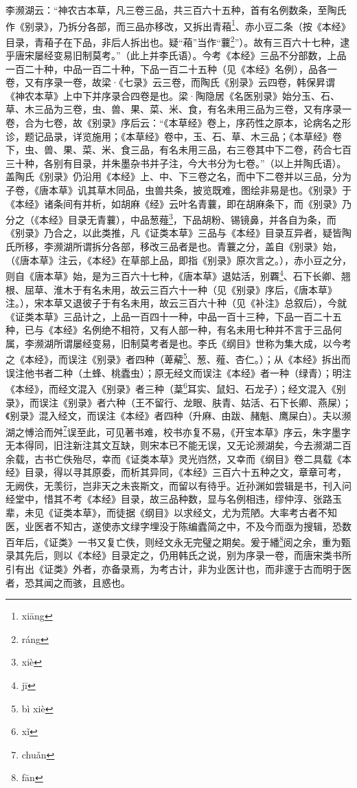 \documentclass[12pt,UTF8]{ctexbook}
\begin{document}
李濒湖云：“神农古本草，凡三卷三品，共三百六十五种，首有名例数条，至陶氏作《别录》，乃拆分各部，而三品亦移改，又拆出青葙\footnote{xi\=ang}、赤小豆二条（按《本经》目录，青葙子在下品，非后人拆出也。疑“葙”当作“蘘\footnote{r\'ang}”）。故有三百六十七种，逮乎唐宋屡经变易旧制莫考。”（此上并李氏语）。今考《本经》三品不分部数，上品一百二十种，中品一百二十种，下品一百二十五种（见《本经》名例），品各一卷，又有序录一卷，故梁·《七录》云三卷，而陶氏《别录》云四卷，韩保昇谓《神农本草》上中下并序录合四卷是也。梁·陶隐居《名医别录》始分玉、石、草、木三品为三卷，虫、兽、果、菜、米、食，有名未用三品为三卷，又有序录一卷，合为七卷，故《别录》序后云：“《本草经》卷上，序药性之原本，论病名之形诊，题记品录，详览施用；《本草经》卷中，玉、石、草、木三品；《本草经》卷下，虫、兽、果、菜、米、食三品，有名未用三品，右三卷其中下二卷，药合七百三十种，各别有目录，并朱墨杂书并子注，今大书分为七卷。”（以上并陶氏语）。盖陶氏《别录》仍沿用《本经》上、中、下三卷之名，而中下二卷并以三品，分为子卷，《唐本草》讥其草木同品，虫兽共条，披览既难，图绘非易是也。《别录》于《本经》诸条间有并析，如胡麻《经》云叶名青蘘，即在胡麻条下，而《别录》乃分之（《本经》目录无青蘘），中品葱薤\footnote{xi\`e}，下品胡粉、锡镜鼻，并各自为条，而《别录》乃合之，以此类推，凡《证类本草》三品与《本经》目录互异者，疑皆陶氏所移，李濒湖所谓拆分各部，移改三品者是也。青蘘之分，盖自《别录》始，（《唐本草》注云，《本经》在草部上品，即指《别录》原次言之。），赤小豆之分，则自《唐本草》始，是为三百六十七种，《唐本草》退姑活，别覉\footnote{j\=i}、石下长卿、翘根、屈草、淮木于有名未用，故云三百六十一种（见《别录》序后，《唐本草》注。），宋本草又退彼子于有名未用，故云三百六十种（见《补注》总叙后），今就《证类本草》三品计之，上品一百四十一种，中品一百十三种，下品一百二十五种，已与《本经》名例绝不相符，又有人部一种，有名未用七种并不言于三品何属，李濒湖所谓屡经变易，旧制莫考者是也。李氏《纲目》世称为集大成，以今考之《本经》，而误注《别录》者四种（萆薢\footnote{b\`i xi\`e}、葱、薤、杏仁。）；从《本经》拆出而误注他书者二种（土蜂、桃蠹虫）；原无经文而误注《本经》者一种（绿青）；明注《本经》，而经文混入《别录》者三种（葈\footnote{x\v{i}}耳实、鼠妇、石龙子）；经文混入《别录》，而误注《别录》者六种（王不留行、龙眼、肤青、姑活、石下长卿、燕屎）；《别录》混入经文，而误注《本经》者四种（升麻、由跋、赭魁、鹰屎白）。夫以濒湖之愽洽而舛\footnote{chu\v{a}n}误至此，可见著书难，校书亦复不易，《开宝本草》序云，朱字墨字无本得同，旧注新注其文互缺，则宋本已不能无误，又无论濒湖矣，今去濒湖二百余载，古书亡佚殆尽，幸而《证类本草》灵光岿然，又幸而《纲目》卷二具载《本经》目录，得以寻其原委，而析其异同，《本经》三百六十五种之文，章章可考，无阙佚，无羡衍，岂非天之未丧斯文，而留以有待乎。近孙渊如尝辑是书，刊入问经堂中，惜其不考《本经》目录，故三品种数，显与名例相违，缪仲淳、张路玉辈，未见《证类本草》，而徒据《纲目》以求经文，尤为荒陋。大率考古者不知医，业医者不知古，遂使赤文绿字埋没于陈编蠹简之中，不及今而亟为搜辑，恐数百年后，《证类》一书又复亡佚，则经文永无完璧之期矣。爰于繙\footnote{f\=an}阅之余，重为甄录其先后，则以《本经》目录定之，仍用韩氏之说，别为序录一卷，而唐宋类书所引有出《证类》外者，亦备录焉，为考古计，非为业医计也，而非邃于古而明于医者，恐其闻之而骇，且惑也。
~\\
\end{document}
